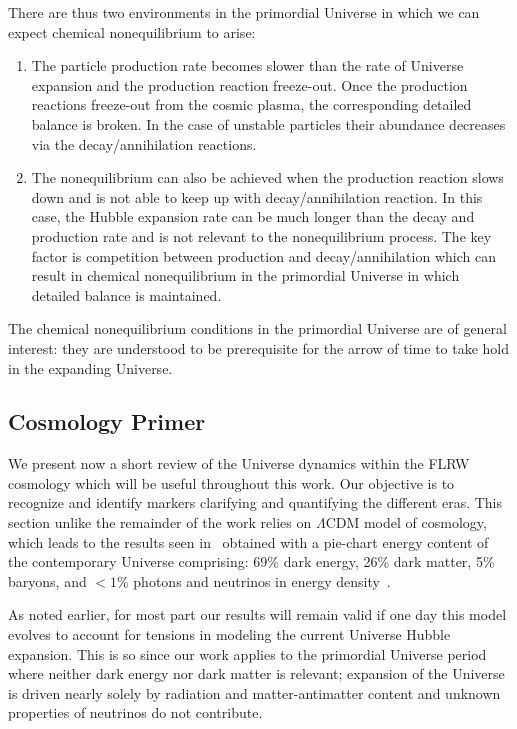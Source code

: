 There are thus two environments in the primordial Universe in which we can expect chemical nonequilibrium to arise:
\begin{enumerate}
\item The particle production rate becomes slower than the rate of Universe expansion and the production reaction freeze-out. Once the production reactions freeze-out from the cosmic plasma, the corresponding detailed balance is broken. In the case of unstable particles their abundance decreases via the decay/annihilation reactions.
%
\item The nonequilibrium can also be achieved when the production reaction slows down and is not able to keep up with decay/annihilation reaction. In this case, the Hubble expansion rate can be much longer than the decay and production rate and is not relevant to the nonequilibrium process. The key factor is competition between production and decay/annihilation which can result in chemical nonequilibrium in the primordial Universe in which detailed balance is maintained.
\end{enumerate}
The chemical nonequilibrium conditions in the primordial Universe are of general interest: they are understood to be prerequisite for the arrow of time to take hold in the expanding Universe.


\subsection{Cosmology Primer}
\label{sec:flrw}
We present now a short review of the Universe dynamics within the FLRW cosmology which will be useful throughout this work. Our objective is to recognize and identify markers clarifying and quantifying the different eras. This section unlike the remainder of the work relies on $\Lambda\mathrm{CDM}$ model of cosmology, which leads to the results seen in~ obtained with a pie-chart energy content of the contemporary Universe comprising: 69\% dark energy, 26\% dark matter, 5\% baryons, and $<1$\% photons and neutrinos in energy density~\cite{Davis:2003ad,Planck:2018vyg}. 

As noted earlier, for most part our results will remain valid if one day this model evolves to account for tensions in modeling the current Universe Hubble expansion. This is so since our work applies to the primordial Universe period where neither dark energy nor dark matter is relevant; expansion of the Universe is driven nearly solely by radiation and matter-antimatter content and unknown properties of neutrinos do not contribute.

